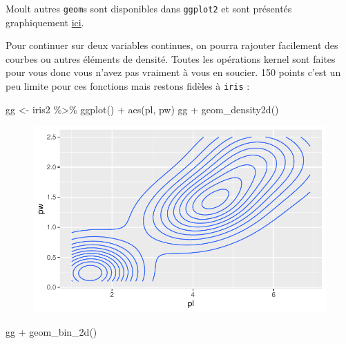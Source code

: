 \documentclass[
  letterpaper,
  DIV=11,
  numbers=noendperiod]{scrreprt}
\newenvironment{Shaded}{\begin{snugshade}}{\end{snugshade}}
\newcommand{\FunctionTok}[1]{\textcolor[rgb]{0.28,0.35,0.67}{#1}}
\newcommand{\NormalTok}[1]{\textcolor[rgb]{0.00,0.23,0.31}{#1}}
\newcommand{\OtherTok}[1]{\textcolor[rgb]{0.00,0.23,0.31}{#1}}
\newcommand{\SpecialCharTok}[1]{\textcolor[rgb]{0.37,0.37,0.37}{#1}}
\begin{document}
Moult autres \texttt{geom}s sont disponibles dans \texttt{ggplot2} et
sont présentés graphiquement
\href{https://ggplot2.tidyverse.org/reference/\#layers}{ici}.

Pour continuer sur deux variables continues, on pourra rajouter
facilement des courbes ou autres éléments de densité. Toutes les
opérations kernel sont faites pour vous donc vous n'avez pas vraiment à
vous en soucier. 150 points c'est un peu limite pour ces fonctions mais
restons fidèles à \texttt{iris} :

\begin{Shaded}
\begin{Highlighting}[]
\NormalTok{gg }\OtherTok{\textless{}{-}}\NormalTok{ iris2 }\SpecialCharTok{\%\textgreater{}\%} \FunctionTok{ggplot}\NormalTok{() }\SpecialCharTok{+} \FunctionTok{aes}\NormalTok{(pl, pw)}
\NormalTok{gg }\SpecialCharTok{+} \FunctionTok{geom\_density2d}\NormalTok{()}
\end{Highlighting}
\end{Shaded}

\begin{figure}[H]

{\centering \includegraphics{ggplot2_files/figure-pdf/unnamed-chunk-22-1.pdf}

}

\end{figure}

\begin{Shaded}
\begin{Highlighting}[]
\NormalTok{gg }\SpecialCharTok{+} \FunctionTok{geom\_bin\_2d}\NormalTok{()}
\end{Highlighting}
\end{Shaded}
\end{document}

